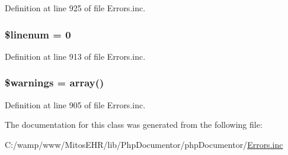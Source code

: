 \-Definition at line 925 of file \-Errors.\-inc.

\hypertarget{class_error_tracker_a597bef7e50a56c650cf17a1ed6bc5595}{
\subsubsection[{\$linenum}]{\setlength{\rightskip}{0pt plus 5cm}\$linenum = 0}}\label{class_error_tracker_a597bef7e50a56c650cf17a1ed6bc5595}


\-Definition at line 913 of file \-Errors.\-inc.

\hypertarget{class_error_tracker_a46209434b2ef1d7554dc5135de969432}{
\subsubsection[{\$warnings}]{\setlength{\rightskip}{0pt plus 5cm}\$warnings = array()}}\label{class_error_tracker_a46209434b2ef1d7554dc5135de969432}


\-Definition at line 905 of file \-Errors.\-inc.



\-The documentation for this class was generated from the following file\-:\begin{DoxyCompactItemize}
\item 
\-C\-:/wamp/www/\-Mitos\-E\-H\-R/lib/\-Php\-Documentor/php\-Documentor/\hyperlink{_errors_8inc}{\-Errors.\-inc}\end{DoxyCompactItemize}
